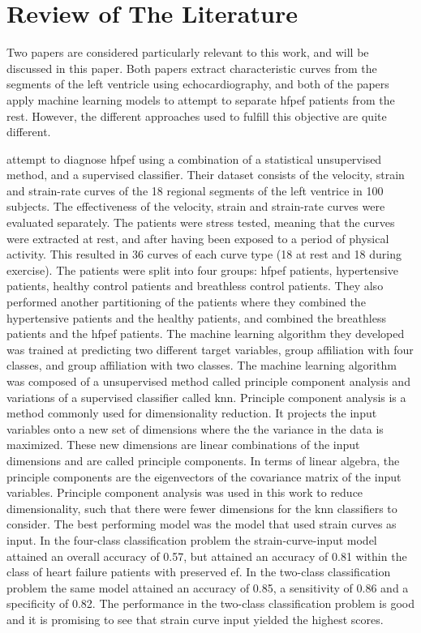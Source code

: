 \chapter{Review of The Literature} \label{chap:lit}

Two papers are considered particularly relevant to this work, and will be discussed in this paper. Both papers extract characteristic curves from the segments of the left ventricle using echocardiography, and both of the papers apply machine learning models to attempt to separate \acrshort{hfpef} patients from the rest. However, the different approaches used to fulfill this objective are quite different. 

\textcite{hf_diagnosis_ml} attempt to diagnose \acrshort{hfpef} using a combination of a statistical unsupervised method, and a supervised classifier. Their dataset consists of the velocity, strain and strain-rate curves of the 18 regional segments of the left ventrice in 100 subjects. The effectiveness of the velocity, strain and strain-rate curves were evaluated separately. The patients were stress tested, meaning that the curves were extracted at rest, and after having been exposed to a period of physical activity. This resulted in 36 curves of each curve type (18 at rest and 18 during exercise). The patients were split into four groups: \acrshort{hfpef} patients, hypertensive patients, healthy control patients and breathless control patients. They also performed another partitioning of the patients where they combined the hypertensive patients and the healthy patients, and combined the breathless patients and the \acrshort{hfpef} patients. The machine learning algorithm they developed was trained at predicting two different target variables, group affiliation with four classes, and group affiliation with two classes. The machine learning algorithm was composed of a unsupervised method called principle component analysis and variations of a supervised classifier called \acrfull{knn}. Principle component analysis is a method commonly used for dimensionality reduction. It projects the input variables onto a new set of dimensions where the the variance in the data is maximized. These new dimensions are linear combinations of the input dimensions and are called principle components. In terms of linear algebra, the principle components are the eigenvectors of the covariance matrix of the input variables. Principle component analysis was used in this work to reduce  dimensionality, such that there were fewer dimensions for the \acrshort{knn} classifiers to consider. The best performing model was the model that used strain curves as input. In the four-class classification problem the strain-curve-input model attained an overall accuracy of 0.57, but attained an accuracy of 0.81 within the class of heart failure patients with preserved \acrshort{ef}. In the two-class classification problem the same model attained an accuracy of 0.85, a sensitivity of 0.86 and a specificity of 0.82. The performance in the two-class classification problem is good and it is promising to see that strain curve input yielded the highest scores. \bigskip


